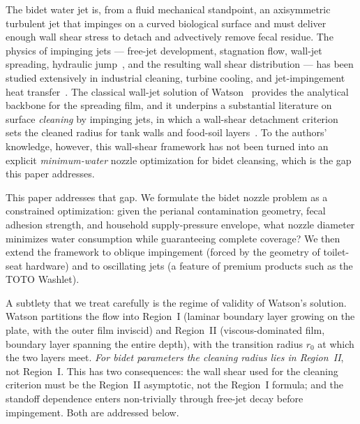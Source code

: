\documentclass[aps,prfluids,reprint,amsmath,amssymb,floatfix]{revtex4-2}
\begin{document}
The bidet water jet is, from a fluid mechanical standpoint, an axisymmetric
turbulent jet that impinges on a curved biological surface and must
deliver enough wall shear stress to detach and advectively remove fecal
residue. The physics of impinging jets --- free-jet development, stagnation
flow, wall-jet spreading, hydraulic jump~\citep{BohrEtAl1993,BushAristoff2003},
and the resulting wall shear
distribution --- has been studied extensively in industrial cleaning,
turbine cooling, and jet-impingement heat transfer~\citep{ZuckermanLior2006}.
The classical wall-jet solution of Watson~\citep{Watson1964} provides the
analytical backbone for the spreading film, and it underpins a substantial
literature on surface \emph{cleaning} by impinging jets, in which a wall-shear
detachment criterion sets the cleaned radius for tank walls and food-soil
layers~\citep{Wilson2014,BhagatWilson2016}. To the authors' knowledge, however,
this wall-shear framework has not been turned into an explicit
\emph{minimum-water} nozzle optimization for bidet cleansing, which is the gap
this paper addresses.

This paper addresses that gap. We formulate the bidet nozzle problem as a
constrained optimization: given the perianal contamination geometry, fecal
adhesion strength, and household supply-pressure envelope, what nozzle
diameter minimizes water consumption while guaranteeing complete coverage?
We then extend the framework to oblique impingement (forced by the
geometry of toilet-seat hardware) and to oscillating jets (a feature of
premium products such as the TOTO Washlet).

A subtlety that we treat carefully is the regime of validity of Watson's
solution. Watson partitions the flow into Region~I (laminar boundary
layer growing on the plate, with the outer film inviscid) and Region~II
(viscous-dominated film, boundary layer spanning the entire depth), with
the transition radius $r_0$ at which the two layers meet. \emph{For
bidet parameters the cleaning radius lies in Region~II}, not Region~I.
This has two consequences: the wall shear used for the cleaning criterion
must be the Region~II asymptotic, not the Region~I formula; and the
standoff dependence enters non-trivially through free-jet decay before
impingement. Both are addressed below.
\end{document}
